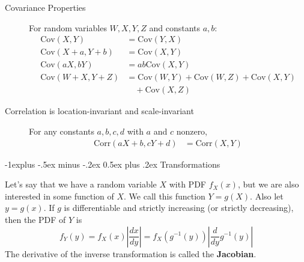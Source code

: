 \documentclass[10pt,landscape]{article}
\makeatletter
\newcommand{\cov}{\textrm{Cov}}
\newcommand{\corr}{\textrm{Corr}}
\renewcommand{\subsection}{\@startsection{subsection}{2}{0mm}%
{-1explus -.5ex minus -.2ex}%
{0.5ex plus .2ex}%
{\normalfont\normalsize\bfseries}}
\makeatother
\begin{document}
\begin{multicols*}{3}
\begin{description}
            \item [Covariance Properties]  For random variables $W, X, Y, Z$ and constants $a, b$:
            \begin{align*}
                \cov(X, Y)         & = \cov(Y, X)                           \\
                \cov(X + a, Y + b) & = \cov(X, Y)                           \\
                \cov(aX, bY)       & = ab\cov(X, Y)                         \\
                \cov(W + X, Y + Z) & = \cov(W, Y) + \cov(W, Z) + \cov(X, Y) \\
                & \quad + \cov(X, Z)
            \end{align*}
            \item [Correlation is location-invariant and scale-invariant] For any constants $a,b,c,d$ with $a$ and $c$ nonzero,
            \begin{align*}
                \corr(aX + b, cY + d) & = \corr(X, Y)
            \end{align*}
        \end{description}

        \subsection{Transformations}
        \begin{description}
            \label{one variable transformations}
            \item[One Variable Transformations] Let's say that we have a random variable $X$ with PDF $f_X(x)$, but we are also interested in some function of $X$. We call this function $Y = g(X)$. Also let $y=g(x)$. If $g$ is differentiable and strictly increasing (or strictly decreasing), then the PDF of $Y$ is
            \[
                f_Y(y) = f_X(x)\left|\frac{dx}{dy}\right| = f_X(g^{-1}(y))\left|\frac{d}{dy}g^{-1}(y)\right|
            \]
            The derivative of the inverse transformation is called the \textbf{Jacobian}.


\end{description}
\end{multicols*}
\end{document}
